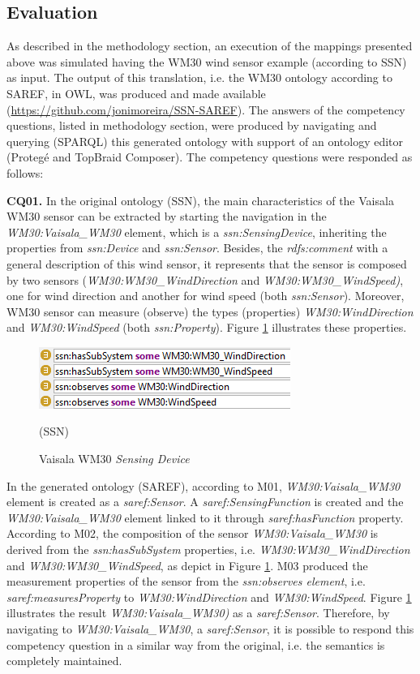 \documentclass{sig-alternate-05-2015}
\begin{document}
\subsection{Evaluation}
As described in the methodology section, an execution of the mappings presented above was simulated having the WM30 wind sensor example (according to SSN) as input. The output of this translation, i.e. the WM30 ontology according to SAREF, in OWL, was produced and made available (\url{https://github.com/jonimoreira/SSN-SAREF}). The answers of the competency questions, listed in methodology section, were produced by navigating and querying (SPARQL) this generated ontology with support of an ontology editor (Protegé and TopBraid Composer). The competency questions were responded as follows:

\textbf{CQ01.} In the original ontology (SSN), the main characteristics of the Vaisala WM30 sensor can be extracted by starting the navigation in the \textit{WM30:Vaisala\_WM30} element, which is a \textit{ssn:SensingDevice}, inheriting the properties from \textit{ssn:Device} and \textit{ssn:Sensor}. Besides, the \textit{rdfs:comment} with a general description of this wind sensor, it represents that the sensor is composed by two sensors (\textit{WM30:WM30\_WindDirection} and \textit{WM30:WM30\_WindSpeed)}, one for wind direction and another for wind speed (both \textit{ssn:Sensor}). Moreover, WM30 sensor can measure (observe) the types (properties) \textit{WM30:WindDirection} and \textit{WM30:WindSpeed} (both \textit{ssn:Property}). Figure \ref{fig:SSN_SystemProperties} illustrates these properties.

\begin{figure}[h!]
\centering
\includegraphics[scale=0.98]{SSN_SystemProperties}
\caption{Vaisala WM30 \textit{Sensing Device}} (SSN)
\label{fig:SSN_SystemProperties}
\end{figure}

In the generated ontology (SAREF), according to M01, \textit{WM30:Vaisala\_WM30} element is created as a \textit{saref:Sensor}. A \textit{saref:SensingFunction} is created and the \textit{WM30:Vaisala\_WM30} element linked to it through \textit{saref:hasFunction} property. According to M02, the composition of the sensor \textit{WM30:Vaisala\_WM30} is derived from the \textit{ssn:hasSubSystem} properties, i.e. \textit{WM30:WM30\_WindDirection} and \textit{WM30:WM30\_WindSpeed}, as depict in Figure \ref{fig:SSN_SystemProperties}. M03 produced the measurement properties of the sensor from the \textit{ssn:observes element}, i.e. \textit{saref:measuresProperty} to \textit{WM30:WindDirection} and \textit{WM30:WindSpeed}. Figure \ref{fig:SSN_SystemProperties} illustrates the result \textit{WM30:Vaisala\_WM30)} as a \textit{saref:Sensor}. Therefore, by navigating to \textit{WM30:Vaisala\_WM30}, a \textit{saref:Sensor}, it is possible to respond this competency question in a similar way from the original, i.e. the semantics is completely maintained.  
\end{document}
